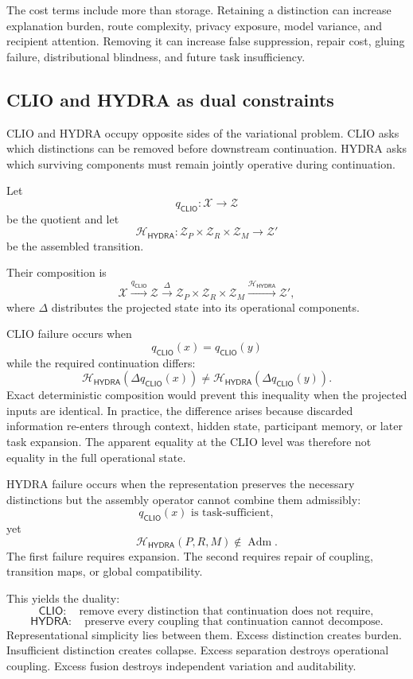 \documentclass[11pt]{article}
\theoremstyle{definition}
\DeclareMathOperator{\Adm}{Adm}
\newcommand{\CLIO}{\mathsf{CLIO}}
\newcommand{\HYDRA}{\mathsf{HYDRA}}
\begin{document}
The cost terms include more than storage. Retaining a distinction can increase explanation burden, route complexity, privacy exposure, model variance, and recipient attention. Removing it can increase false suppression, repair cost, gluing failure, distributional blindness, and future task insufficiency.

\subsection{CLIO and HYDRA as dual constraints}

CLIO and HYDRA occupy opposite sides of the variational problem. CLIO asks which distinctions can be removed before downstream continuation. HYDRA asks which surviving components must remain jointly operative during continuation.

Let
\[
q_{\CLIO}:\mathcal{X}\to\mathcal{Z}
\]
be the quotient and let
\[
\mathcal{H}_{\HYDRA}:
\mathcal{Z}_P
\times
\mathcal{Z}_R
\times
\mathcal{Z}_M
\to
\mathcal{Z}'
\]
be the assembled transition.

Their composition is
\[
\mathcal{X}
\xrightarrow{q_{\CLIO}}
\mathcal{Z}
\xrightarrow{\Delta}
\mathcal{Z}_P
\times
\mathcal{Z}_R
\times
\mathcal{Z}_M
\xrightarrow{\mathcal{H}_{\HYDRA}}
\mathcal{Z}',
\]
where \(\Delta\) distributes the projected state into its operational components.

CLIO failure occurs when
\[
q_{\CLIO}(x)=q_{\CLIO}(y)
\]
while the required continuation differs:
\[
\mathcal{H}_{\HYDRA}(\Delta q_{\CLIO}(x))
\neq
\mathcal{H}_{\HYDRA}(\Delta q_{\CLIO}(y)).
\]
Exact deterministic composition would prevent this inequality when the projected inputs are identical. In practice, the difference arises because discarded information re-enters through context, hidden state, participant memory, or later task expansion. The apparent equality at the CLIO level was therefore not equality in the full operational state.

HYDRA failure occurs when the representation preserves the necessary distinctions but the assembly operator cannot combine them admissibly:
\[
q_{\CLIO}(x)\text{ is task-sufficient},
\]
yet
\[
\mathcal{H}_{\HYDRA}(P,R,M)\notin\Adm.
\]
The first failure requires expansion. The second requires repair of coupling, transition maps, or global compatibility.

This yields the duality:
\[
\CLIO:
\quad
\text{remove every distinction that continuation does not require},
\]
\[
\HYDRA:
\quad
\text{preserve every coupling that continuation cannot decompose}.
\]
Representational simplicity lies between them. Excess distinction creates burden. Insufficient distinction creates collapse. Excess separation destroys operational coupling. Excess fusion destroys independent variation and auditability.
\end{document}
